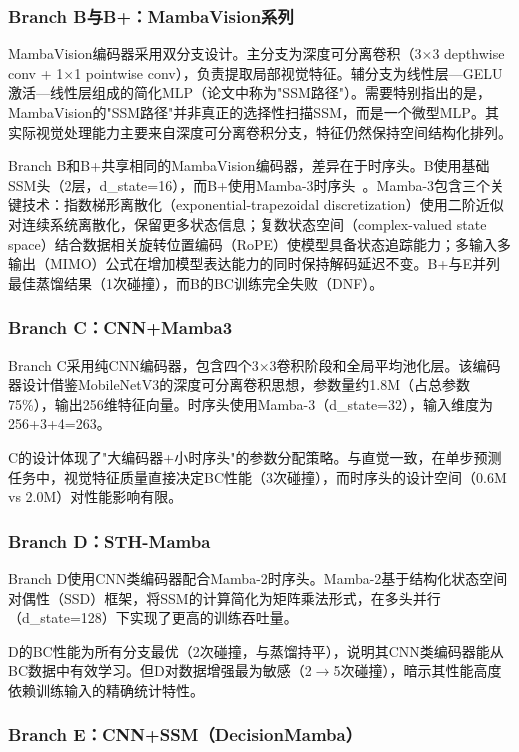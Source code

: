\documentclass[12pt,a4paper]{article}
\numberwithin{equation}{section}
\numberwithin{figure}{section}
\numberwithin{table}{section}
\begin{document}
\subsubsection{Branch B与B+：MambaVision系列}

MambaVision编码器采用双分支设计。主分支为深度可分离卷积（3$\times$3 depthwise conv + 1$\times$1 pointwise conv），负责提取局部视觉特征。辅分支为线性层—GELU激活—线性层组成的简化MLP（论文中称为"SSM路径"）。需要特别指出的是，MambaVision的"SSM路径"并非真正的选择性扫描SSM，而是一个微型MLP。其实际视觉处理能力主要来自深度可分离卷积分支，特征仍然保持空间结构化排列。

Branch B和B+共享相同的MambaVision编码器，差异在于时序头。B使用基础SSM头（2层，d\_state=16），而B+使用Mamba-3时序头~\cite{lahoti2026mamba3}。Mamba-3包含三个关键技术：指数梯形离散化（exponential-trapezoidal discretization）使用二阶近似对连续系统离散化，保留更多状态信息；复数状态空间（complex-valued state space）结合数据相关旋转位置编码（RoPE）使模型具备状态追踪能力；多输入多输出（MIMO）公式在增加模型表达能力的同时保持解码延迟不变。B+与E并列最佳蒸馏结果（1次碰撞），而B的BC训练完全失败（DNF）。

\subsubsection{Branch C：CNN+Mamba3}

Branch C采用纯CNN编码器，包含四个3$\times$3卷积阶段和全局平均池化层。该编码器设计借鉴MobileNetV3的深度可分离卷积思想，参数量约1.8M（占总参数75\%），输出256维特征向量。时序头使用Mamba-3（d\_state=32），输入维度为256+3+4=263。

C的设计体现了"大编码器+小时序头"的参数分配策略。与直觉一致，在单步预测任务中，视觉特征质量直接决定BC性能（3次碰撞），而时序头的设计空间（0.6M vs 2.0M）对性能影响有限。

\subsubsection{Branch D：STH-Mamba}

Branch D使用CNN类编码器配合Mamba-2时序头。Mamba-2基于结构化状态空间对偶性（SSD）框架，将SSM的计算简化为矩阵乘法形式，在多头并行（d\_state=128）下实现了更高的训练吞吐量。

D的BC性能为所有分支最优（2次碰撞，与蒸馏持平），说明其CNN类编码器能从BC数据中有效学习。但D对数据增强最为敏感（2$\rightarrow$5次碰撞），暗示其性能高度依赖训练输入的精确统计特性。

\subsubsection{Branch E：CNN+SSM（DecisionMamba）}
\end{document}
